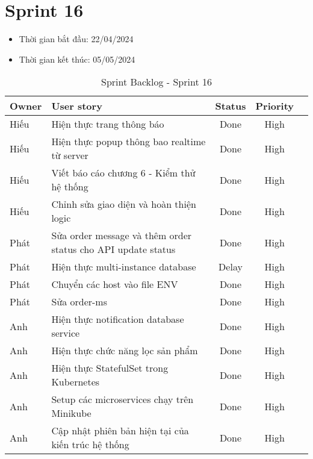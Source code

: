 \section{Sprint 16}
\begin{itemize}
    \item Thời gian bắt đầu: 22/04/2024
    \item Thời gian kết thúc: 05/05/2024
\end{itemize}
\begin{table}[H]
    \begin{tabular}{|m{2.5cm}|m{9cm}|c|c|c|}
    \hline
    \textbf{Owner}  & \textbf{User story}                                & \textbf{Status}  & \textbf{Priority} \\ \hline
    Hiếu                & Hiện thực trang thông báo                 & Done                              & High         \\ \hline
    Hiếu               & Hiện thực popup thông bao realtime từ server                 & Done                              & High         \\ \hline
    Hiếu                & Viết báo cáo chương 6 - Kiểm thử hệ thống                 & Done                              & High         \\ \hline
    Hiếu               & Chỉnh sửa giao diện và hoàn thiện logic                 & Done                              & High         \\ \hline
    Phát               & Sửa order message và thêm order status cho API update status                 & Done                              & High         \\ \hline
    Phát               & Hiện thực multi-instance database                & Delay                              & High         \\ \hline
    Phát              & Chuyển các host vào file ENV                & Done                              & High         \\ \hline
    Phát              & Sửa order-ms                 & Done                              & High         \\ \hline
    Anh               & Hiện thực notification database service                 & Done                              & High         \\ \hline
    Anh               & Hiện thực chức năng lọc sản phẩm                 & Done                              & High         \\ \hline
    Anh              & Hiện thực StatefulSet trong Kubernetes                & Done                              & High         \\ \hline
    Anh              & Setup các microservices chạy trên Minikube                & Done                              & High         \\ \hline
    Anh               & Cập nhật phiên bản hiện tại của kiến trúc hệ thống                & Done                              & High         \\ \hline
    \end{tabular}
    \caption{Sprint Backlog - Sprint 16}
    \label{tab:sprint-16}
\end{table}
